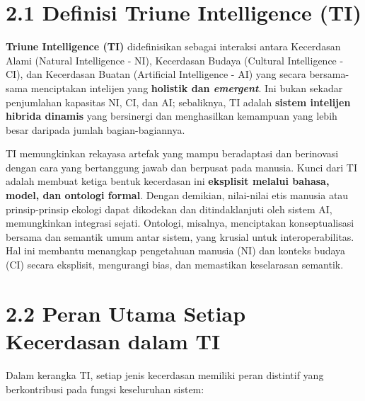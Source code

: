 \documentclass[
  letterpaper,
  DIV=11,
  numbers=noendperiod]{scrreprt}
\begin{document}
\section{\texorpdfstring{\textbf{2.1 Definisi Triune Intelligence
(TI)}}{2.1 Definisi Triune Intelligence (TI)}}\label{definisi-triune-intelligence-ti}

\textbf{Triune Intelligence (TI)} didefinisikan sebagai interaksi antara
Kecerdasan Alami (Natural Intelligence - NI), Kecerdasan Budaya
(Cultural Intelligence - CI), dan Kecerdasan Buatan (Artificial
Intelligence - AI) yang secara bersama-sama menciptakan intelijen yang
\textbf{holistik dan \emph{emergent}}. Ini bukan sekadar penjumlahan
kapasitas NI, CI, dan AI; sebaliknya, TI adalah \textbf{sistem intelijen
hibrida dinamis} yang bersinergi dan menghasilkan kemampuan yang lebih
besar daripada jumlah bagian-bagiannya.

TI memungkinkan rekayasa artefak yang mampu beradaptasi dan berinovasi
dengan cara yang bertanggung jawab dan berpusat pada manusia. Kunci dari
TI adalah membuat ketiga bentuk kecerdasan ini \textbf{eksplisit melalui
bahasa, model, dan ontologi formal}. Dengan demikian, nilai-nilai etis
manusia atau prinsip-prinsip ekologi dapat dikodekan dan ditindaklanjuti
oleh sistem AI, memungkinkan integrasi sejati. Ontologi, misalnya,
menciptakan konseptualisasi bersama dan semantik umum antar sistem, yang
krusial untuk interoperabilitas. Hal ini membantu menangkap pengetahuan
manusia (NI) dan konteks budaya (CI) secara eksplisit, mengurangi bias,
dan memastikan keselarasan semantik.

\section{\texorpdfstring{\textbf{2.2 Peran Utama Setiap Kecerdasan dalam
TI}}{2.2 Peran Utama Setiap Kecerdasan dalam TI}}\label{peran-utama-setiap-kecerdasan-dalam-ti}

Dalam kerangka TI, setiap jenis kecerdasan memiliki peran distintif yang
berkontribusi pada fungsi keseluruhan sistem:
\end{document}
